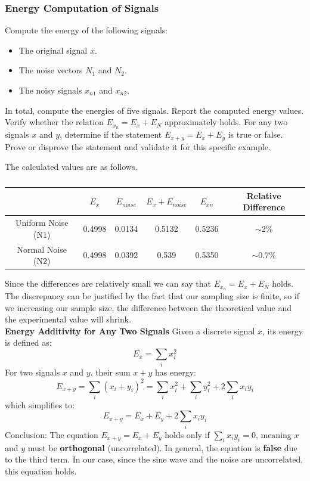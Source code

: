 \documentclass[hidelinks,12pt]{article}
\begin{document}
	
	\subsubsection{Energy Computation of Signals}
	Compute the energy of the following signals:
	\begin{itemize}
		\item The original signal $x$.
		\item The noise vectors $N_1$ and $N_2$.
		\item The noisy signals $x_{n1}$ and $x_{n2}$.
	\end{itemize}
	
	 In total, compute the energies of five signals. Report the computed energy values. Verify whether the relation $E_{x_n} = E_x + E_N$ approximately holds. For any two signals $x$ and $y$, determine if the statement $E_{x+y} = E_x + E_y$ is true or false. Prove or disprove the statement and validate it for this specific example.
	
	 The calculated values are as follows.
	
	\begin{table}[h!]
		\centering
		\begin{tabular}{c|c|c|c|c|c|}
			\cline{2-6}
			& $E_x$  & $E_{noise}$ & $E_{x} + E_{noise}$ & $E_{xn}$ & Relative Difference \\ \hline
			\multicolumn{1}{|c|}{Uniform Noise (N1)} & 0.4998 & 0.0134      & 0.5132              & 0.5236      & $\sim$2\%           \\ \hline
			\multicolumn{1}{|c|}{Normal Noise (N2)}  & 0.4998 & 0.0392      & 0.539               & 0.5350      & $\sim$0.7\%         \\ \hline
		\end{tabular}
		\caption{}
	\end{table}
	
	
	 Since the differences are relatively small we can say that $E_{x_n} = E_x + E_N$ holds. The discrepancy can be justified by the fact that our sampling size is finite, so if we increasing our sample size, the difference between the theoretical value and the experimental value will shrink.
	\\
	
	 \textbf{Energy Additivity for Any Two Signals}
	Given a discrete signal $x$, its energy is defined as:
	$$
	E_x = \sum_{i} x_i^2
	$$
	For two signals $x$ and $y$, their sum $x + y$ has energy:
	$$
	E_{x+y} = \sum_{i} (x_i + y_i)^2 = \sum_{i} x_i^2 + \sum_{i} y_i^2 + 2\sum_{i} x_i y_i
	$$
	which simplifies to:
	$$
	E_{x+y} = E_x + E_y + 2 \sum_{i} x_i y_i
	$$
	Conclusion: The equation $E_{x+y} = E_x + E_y$ holds only if $\sum_{i} x_i y_i = 0$, meaning $x$ and $y$ must be \textbf{orthogonal} (uncorrelated). In general, the equation is \textbf{false} due to the third term. In our case, since the sine wave and the noise are uncorrelated, this equation holds.
	
\end{document}
